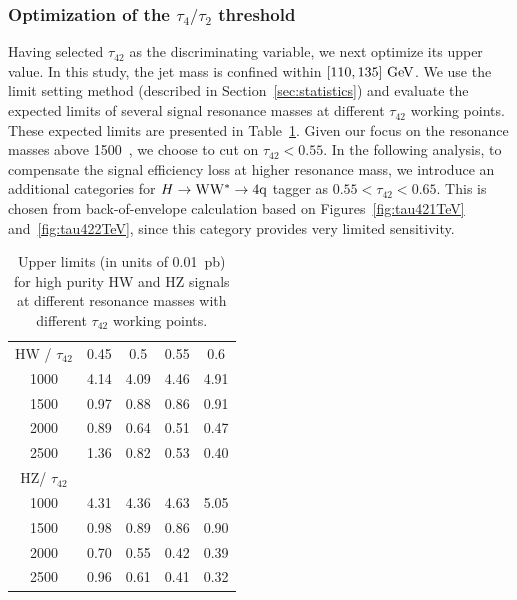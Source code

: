 \clearpage

\subsubsection{Optimization of the $\tau_4/\tau_2$ threshold}
\label{sec:tau42Opti}


Having selected $\tau_{42}$ as the discriminating variable, we next
optimize its upper value.  In this study, the jet mass is confined
within $[110, 135]~\mathrm{GeV}$.  We use the limit setting method (described
in Section~\ref{sec:statistics}) and evaluate the expected limits of
several signal resonance masses at different $\tau_{42}$ working
points.  These expected limits are presented
in Table~\ref{table:tau42Opti}.
Given our focus on the resonance masses above 1500~\GeVcc, we
choose to cut on $\tau_{42} < 0.55$. In the following analysis, 
to compensate the signal efficiency loss at higher resonance mass, we 
introduce an additional categories for $H\to{\rm W}{\rm W}^*\to4{\rm q}$ tagger as $0.55 < \tau_{42} < 0.65$.
This is chosen from back-of-envelope calculation based on 
Figures~\ref{fig:tau421TeV} and~\ref{fig:tau422TeV}, since this category provides 
very limited sensitivity.  

\begin{table}[htbp]
\begin{center}
\caption{Upper limits (in units of 0.01~pb) 
for high purity HW and HZ signals at different resonance masses with
different $\tau_{42}$ working points. }
\label{table:tau42Opti}
\begin{tabular}{ccccc}
\hline
HW / $\tau_{42}$ & 0.45 & 0.5 & 0.55 & 0.6 \\ 
1000 & 4.14 & 4.09 & 4.46 & 4.91 \\ 
1500 & 0.97 & 0.88 & 0.86 & 0.91 \\ 
2000 & 0.89 & 0.64 & 0.51 & 0.47 \\ 
2500 & 1.36 & 0.82 & 0.53 & 0.40 \\ \hline 
HZ/ $\tau_{42}$ &   &  & &  \\ 
1000 & 4.31 & 4.36 & 4.63 & 5.05 \\ 
1500 & 0.98 & 0.89 & 0.86 & 0.90 \\ 
2000 & 0.70 & 0.55 & 0.42 & 0.39 \\ 
2500 & 0.96 & 0.61 & 0.41 & 0.32 \\ \hline
\end{tabular}
\end{center}
\end{table}



